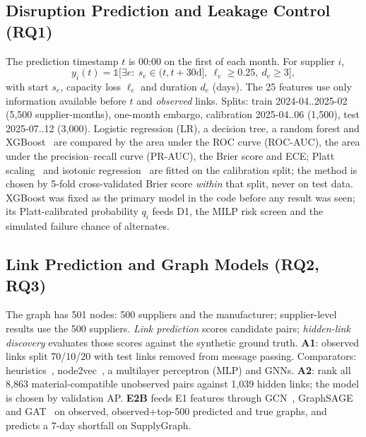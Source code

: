 \documentclass[conference]{IEEEtran}
\newcommand{\TestRows}{3,000}
\newcommand{\LinkCand}{8,863}
\newcommand{\LinkHid}{1,039}
\begin{document}
\subsection{Disruption Prediction and Leakage Control (RQ1)}
The prediction timestamp $t$ is 00:00 on the first of each month. For supplier $i$,
\begin{equation}\label{eq:label}
y_i(t)=\mathbb{1}\big[\exists e:\ s_e\in(t,t+30\mathrm{d}],\ \ell_e\ge0.25,\ d_e\ge3\big],
\end{equation}
with start $s_e$, capacity loss $\ell_e$ and duration $d_e$ (days). The 25 features use only information available before $t$ and \emph{observed}
links. Splits: train 2024-04..2025-02 (5,500 supplier-months), one-month embargo, calibration 2025-04..06 (1,500), test 2025-07..12 (\TestRows).
Logistic regression (LR), a decision tree, a random forest and XGBoost~\cite{chen2016} are compared by the area under the ROC curve (ROC-AUC), the area under the precision--recall curve (PR-AUC), the Brier score and ECE; Platt scaling~\cite{platt1999} and isotonic
regression~\cite{zadrozny2002,niculescu2005} are fitted on the calibration split; the method is chosen by 5-fold cross-validated Brier score
\emph{within} that split, never on test data. XGBoost was fixed as the primary model in the code before any result was seen; its Platt-calibrated
probability $q_i$ feeds D1, the MILP risk screen and the simulated failure chance of alternates.

\subsection{Link Prediction and Graph Models (RQ2, RQ3)}
The graph has 501 nodes: 500 suppliers and the manufacturer; supplier-level results use the 500 suppliers. \emph{Link prediction} scores
candidate pairs; \emph{hidden-link discovery} evaluates those scores against the synthetic ground truth. \textbf{A1}: observed links split
70/10/20 with test links removed from message passing. Comparators: heuristics~\cite{libennowell2007}, node2vec~\cite{grover2016}, a multilayer perceptron (MLP) and GNNs. \textbf{A2}: rank all \LinkCand{} material-compatible unobserved pairs against
\LinkHid{} hidden links; the model is chosen by validation AP. \textbf{E2B} feeds E1 features through GCN~\cite{kipf2017}, GraphSAGE~\cite{hamilton2017} and
GAT~\cite{velickovic2018} on observed, observed+top-500 predicted and true graphs, and predicts a 7-day shortfall on SupplyGraph.
\end{document}
